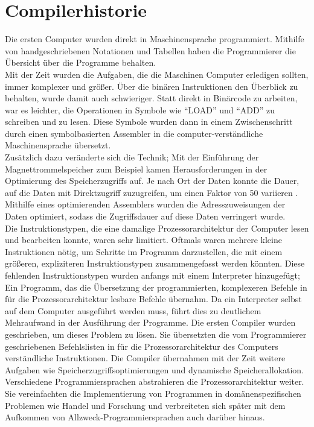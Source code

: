 \section{Compilerhistorie}

Die ersten Computer wurden direkt in Maschinensprache programmiert.
Mithilfe von handgeschriebenen Notationen und Tabellen haben die Programmierer die Übersicht über
die Programme behalten.\\
Mit der Zeit wurden die Aufgaben, die die Maschinen Computer erledigen sollten, immer komplexer und größer.
Über die binären Instruktionen den Überblick zu behalten, wurde damit auch schwieriger.
Statt direkt in Binärcode zu arbeiten, war es leichter, die Operationen in Symbole wie ``LOAD'' und ``ADD'' zu schreiben und zu lesen.
Diese Symbole wurden dann in einem Zwischenschritt durch einen symbolbasierten Assembler in die computer-verständliche Maschinensprache übersetzt.\\
Zusätzlich dazu veränderte sich die Technik; 
Mit der Einführung der Magnettrommelspeicher zum Beispiel kamen Herausforderungen in der Optimierung des Speicherzugriffs auf.
Je nach Ort der Daten konnte die Dauer, auf die Daten mit Direktzugriff zuzugreifen, um einen Faktor von 50 variieren \cite{calingaert:1979}.
Mithilfe eines optimierenden Assemblers wurden die Adresszuweisungen der Daten optimiert, sodass die Zugriffsdauer auf diese Daten verringert wurde.\\
Die Instruktionstypen, die eine damalige Prozessorarchitektur der Computer lesen und bearbeiten konnte, waren sehr limitiert.
Oftmals waren mehrere kleine Instruktionen nötig, um Schritte im Programm darzustellen, die mit einem größeren, expliziteren Instruktionstypen
zusammengefasst werden könnten.
Diese fehlenden Instruktionstypen wurden anfangs mit einem Interpreter hinzugefügt; Ein Programm, das die Übersetzung der programmierten, komplexeren Befehle
in für die Prozessorarchitektur lesbare Befehle übernahm.
Da ein Interpreter selbst auf dem Computer ausgeführt werden muss, führt dies zu deutlichem Mehraufwand in der Ausführung der Programme.
Die ersten Compiler wurden geschrieben, um dieses Problem zu lösen.
Sie übersetzten die vom Programmierer geschriebenen Befehlslisten in für die Prozessorarchitektur des Computers verständliche Instruktionen.
Die Compiler übernahmen mit der Zeit weitere Aufgaben wie Speicherzugriffsoptimierungen und dynamische Speicherallokation.
Verschiedene Programmiersprachen abstrahieren die Prozessorarchitektur weiter.
Sie vereinfachten die Implementierung von Programmen in domänenspezifischen Problemen wie Handel und Forschung und verbreiteten sich später mit dem Aufkommen von Allzweck-Programmiersprachen auch darüber hinaus\cite{calingaert:1979}.

